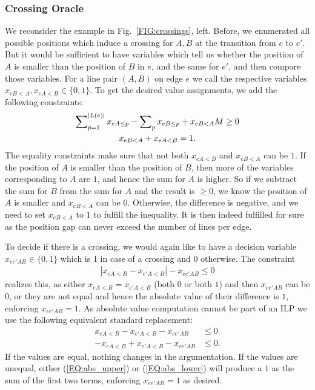 \documentclass[sigconf]{acmart}
\begin{document}
\subsubsection{Crossing Oracle}
We reconsider the example in Fig.~\ref{FIG:crossings}, left. Before, we enumerated all possible positions which induce a crossing for $A, B$ at the transition from $e$ to $e'$. But it would be sufficient to have variables which tell us whether the position of $A$ is smaller than the position of $B$ in $e$, and the same for $e'$, and then compare those variables. For a line pair $(A,B)$ on edge $e$ we call the respective variables $x_{eB<A}, x_{eA<B} \in \{0, 1\}$. %
To get the desired value assignments, we add the following constraints:
\begin{gather}
	\sum\nolimits_{p=1}^{\left|L\left(e\right)\right|} x_{eA\leq p} - \sum\nolimits_{p} x_{eB\leq p} + x_{eB<A} M \geq 0 \\
	x_{eB<A} + x_{eA<B}=1.
\end{gather}
The equality constraints make sure that not both $x_{eA<B}$ and $x_{eB<A}$ can be $1$. If the position of $A$ is smaller than the position of $B$, then more of the variables corresponding to $A$ are $1$, and hence the sum for $A$ is higher. So if we subtract the sum for $B$ from the sum for $A$ and the result is $\geq 0$, we know the position of $A$ is smaller and $x_{eB<A}$ can be $0$. Otherwise, the difference is negative, and we need to set $x_{eB<A}$ to $1$ to fulfill the inequality. It is then indeed fulfilled for sure as the position gap can never exceed the number of lines per edge.

To decide if there is a crossing, we would again like to have a decision variable $x_{ee'AB} \in \{0,1\}$ which is $1$ in case of a crossing and $0$ otherwise. The constraint
\begin{gather}
	\left|x_{eA<B}-x_{e'A<B}\right| - x_{ee'AB} \leq 0
\end{gather}
realizes this, as either $x_{eA<B} = x_{e'A<B}$ (both $0$ or both $1$) and then $x_{ee'AB}$ can be $0$, or they are not equal and hence the absolute value of their difference is $1$, enforcing $x_{ee'AB}=1$. As absolute value computation cannot be part of an ILP we use the following equivalent standard replacement:
\begin{align}
	x_{eA<B} - x_{e'A<B} - x_{ee'AB} &\leq 0 \label{EQ:abs_upper}\\
	-x_{eA<B} + x_{e'A<B} - x_{ee'AB} &\leq 0. \label{EQ:abs_lower}
\end{align}
If the values are equal, nothing changes in the argumentation. If the values are unequal, either (\ref{EQ:abs_upper}) or (\ref{EQ:abs_lower})  will produce a $1$ as the sum of the first two terms, enforcing $x_{ee'AB}=1$ as desired.
\end{document}
